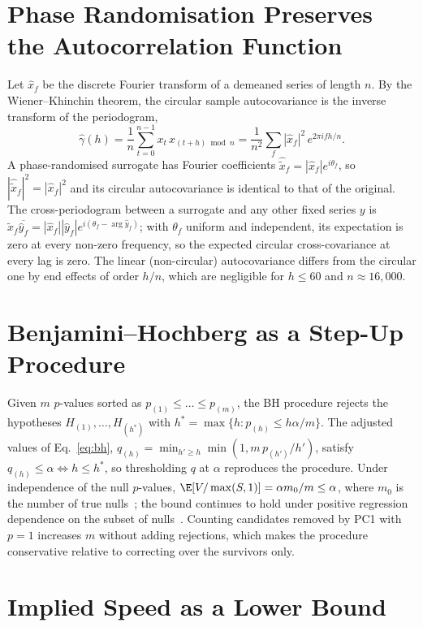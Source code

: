 \section{Phase Randomisation Preserves the Autocorrelation Function}
\label{app:phaserand}

Let $\hat{x}_f$ be the discrete Fourier transform of a demeaned series of length $n$. By the Wiener--Khinchin theorem, the circular sample autocovariance is the inverse transform of the periodogram,
\begin{equation}
  \hat\gamma(h) = \frac{1}{n}\sum_{t=0}^{n-1} x_t\,x_{(t+h)\bmod n} = \frac{1}{n^{2}}\sum_{f}|\hat{x}_f|^{2}\,e^{2\pi i f h/n}.
\end{equation}
A phase-randomised surrogate has Fourier coefficients $\hat{\tilde{x}}_f=|\hat{x}_f|e^{i\theta_f}$, so $|\hat{\tilde{x}}_f|^2=|\hat{x}_f|^2$ and its circular autocovariance is identical to that of the original. The cross-periodogram between a surrogate and any other fixed series $y$ is $\hat{\tilde{x}}_f\overline{\hat{y}_f}=|\hat{x}_f||\hat{y}_f|e^{i(\theta_f-\arg\hat{y}_f)}$; with $\theta_f$ uniform and independent, its expectation is zero at every non-zero frequency, so the expected circular cross-covariance at every lag is zero. The linear (non-circular) autocovariance differs from the circular one by end effects of order $h/n$, which are negligible for $h\le 60$ and $n\approx 16{,}000$.

\section{Benjamini--Hochberg as a Step-Up Procedure}
\label{app:bh}

Given $m$ $p$-values sorted as $p_{(1)}\le\dots\le p_{(m)}$, the BH procedure rejects the hypotheses $H_{(1)},\dots,H_{(h^\ast)}$ with $h^\ast=\max\{h: p_{(h)}\le h\alpha/m\}$. The adjusted values of Eq.~\eqref{eq:bh}, $q_{(h)}=\min_{h'\ge h}\min(1,m\,p_{(h')}/h')$, satisfy $q_{(h)}\le\alpha\iff h\le h^\ast$, so thresholding $q$ at $\alpha$ reproduces the procedure. Under independence of the null $p$-values, $\E[V/\max(S,1)]=\alpha m_0/m\le\alpha$, where $m_0$ is the number of true nulls~\cite{benjamini1995controlling}; the bound continues to hold under positive regression dependence on the subset of nulls~\cite{benjamini2001control}. Counting candidates removed by PC1 with $p=1$ increases $m$ without adding rejections, which makes the procedure conservative relative to correcting over the survivors only.

\section{Implied Speed as a Lower Bound}
\label{app:speed}

